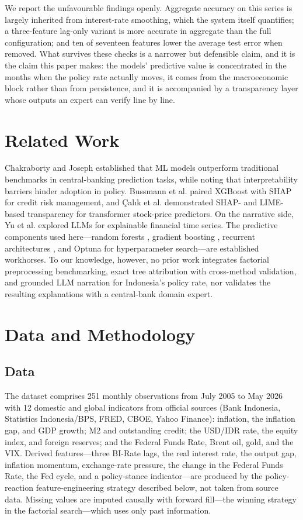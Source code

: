 \documentclass[conference]{IEEEtran}
\begin{document}
We report the unfavourable findings openly. Aggregate accuracy on this series is largely inherited from interest-rate smoothing, which the system itself quantifies; a three-feature lag-only variant is more accurate in aggregate than the full configuration; and ten of seventeen features lower the average test error when removed. What survives these checks is a narrower but defensible claim, and it is the claim this paper makes: the models' predictive value is concentrated in the months when the policy rate actually moves, it comes from the macroeconomic block rather than from persistence, and it is accompanied by a transparency layer whose outputs an expert can verify line by line.

\section{Related Work}
Chakraborty and Joseph \cite{chakraborty2017} established that ML models outperform traditional benchmarks in central-banking prediction tasks, while noting that interpretability barriers hinder adoption in policy. Bussmann et al. \cite{bussmann2021} paired XGBoost with SHAP for credit risk management, and \c{C}al{\i}k et al. \cite{calik2025} demonstrated SHAP- and LIME-based transparency for transformer stock-price predictors. On the narrative side, Yu et al. \cite{yu2023} explored LLMs for explainable financial time series. The predictive components used here---random forests \cite{breiman2001}, gradient boosting \cite{chen2016}, recurrent architectures \cite{hochreiter1997,schuster1997}, and Optuna \cite{akiba2019} for hyperparameter search---are established workhorses. To our knowledge, however, no prior work integrates factorial preprocessing benchmarking, exact tree attribution with cross-method validation, and grounded LLM narration for Indonesia's policy rate, nor validates the resulting explanations with a central-bank domain expert.

\section{Data and Methodology}
\subsection{Data}
The dataset comprises 251 monthly observations from July 2005 to May 2026 with 12 domestic and global indicators from official sources (Bank Indonesia, Statistics Indonesia/BPS, FRED, CBOE, Yahoo Finance): inflation, the inflation gap, and GDP growth; M2 and outstanding credit; the USD/IDR rate, the equity index, and foreign reserves; and the Federal Funds Rate, Brent oil, gold, and the VIX. Derived features---three BI-Rate lags, the real interest rate, the output gap, inflation momentum, exchange-rate pressure, the change in the Federal Funds Rate, the Fed cycle, and a policy-stance indicator---are produced by the policy-reaction feature-engineering strategy described below, not taken from source data. Missing values are imputed causally with forward fill---the winning strategy in the factorial search---which uses only past information.
\end{document}
